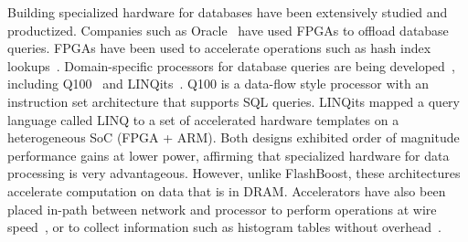 Building specialized hardware for databases have been extensively studied and
productized. Companies such as Oracle~\cite{exadata} 
have used FPGAs to offload database queries.
FPGAs have been used to accelerate operations such as hash index
lookups~\cite{walkers}. Domain-specific processors for database queries are
being developed~\cite{databasefpga, hybridsql}, including Q100~\cite{q100} and LINQits~\cite{linqits}.
Q100 is a data-flow style processor with an instruction set architecture that
supports SQL queries. LINQits mapped a query language called LINQ to a set of
accelerated hardware templates on a heterogeneous SoC (FPGA + ARM). Both designs
exhibited order of magnitude performance gains at lower power, affirming that
specialized hardware for data processing is very advantageous.
However, unlike FlashBoost, these architectures accelerate computation on data that is in DRAM.
Accelerators have also been placed in-path between network and processor to perform operations
at wire speed~\cite{fpgastreamquery}, or to collect information such as
histogram tables without overhead~\cite{histogramssideeffect}.

